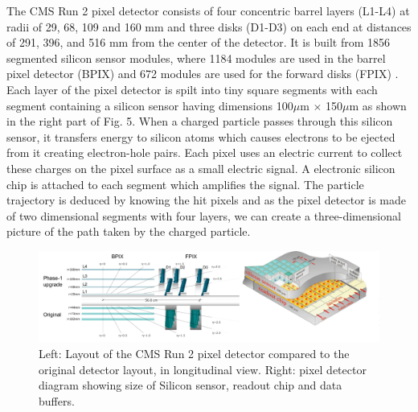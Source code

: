 The CMS Run 2 pixel detector consists of four concentric barrel layers (L1-L4) at radii of 29, 68, 109 and 160 mm and three disks (D1-D3) on each end at distances of 291, 396, and 516 mm from the center of the detector. It is built from 1856 segmented silicon sensor modules, where 1184 modules are used in the barrel pixel detector (BPIX) and 672 modules are used for the forward disks (FPIX) \cite{TrackerGroupoftheCMS:2020bgg}. \\

Each layer of the pixel detector is spilt into tiny square segments with each segment containing a silicon sensor having dimensions 100$\mu$m $\times$ 150$\mu$m as shown in the right part of Fig. 5. When a charged particle passes through this silicon sensor, it transfers energy to silicon atoms which causes electrons to be ejected from it creating electron-hole pairs. Each pixel uses an electric current to collect these charges on the pixel surface as a small electric signal. A electronic silicon chip is attached to each segment which amplifies the signal. The particle trajectory is deduced by knowing the hit pixels and as the pixel detector is made of two dimensional segments with four layers, we can create a three-dimensional picture of the path taken by the charged particle.



\begin{figure}[H]
  \centering
  \includegraphics[width=1 \columnwidth]{./pixeldetector_merged1.png}
  \caption{Left: Layout of the CMS Run 2 pixel detector compared to the original detector layout, in longitudinal view. Right: pixel detector diagram showing size of Silicon sensor, readout chip and data buffers.}
  \label{fig:LHC}
\end{figure}


